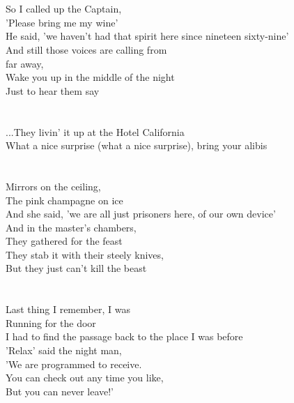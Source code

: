{\\\noindent\vbox{~\\
So I called up the Captain,\\
'Please bring me my wine'\\
He said, 'we haven't had that spirit here since nineteen sixty-nine'\\
And still those voices are calling from\\
far away,\\
Wake you up in the middle of the night\\
Just to hear them say}\\
\\\noindent\vbox{~\\
...They livin' it up at the Hotel California\\
What a nice surprise (what a nice surprise), bring your alibis}\\
\\\noindent\vbox{~\\
Mirrors on the ceiling,\\
The pink champagne on ice\\
And she said, 'we are all just prisoners here, of our own device'\\
And in the master's chambers,\\
They gathered for the feast\\
They stab it with their steely knives,\\
But they just can't kill the beast}\\
\\\noindent\vbox{~\\
Last thing I remember, I was\\
Running for the door\\
I had to find the passage back to the place I was before\\
'Relax' said the night man,\\
'We are programmed to receive.\\
You can check out any time you like,\\
But you can never leave!'}
}


